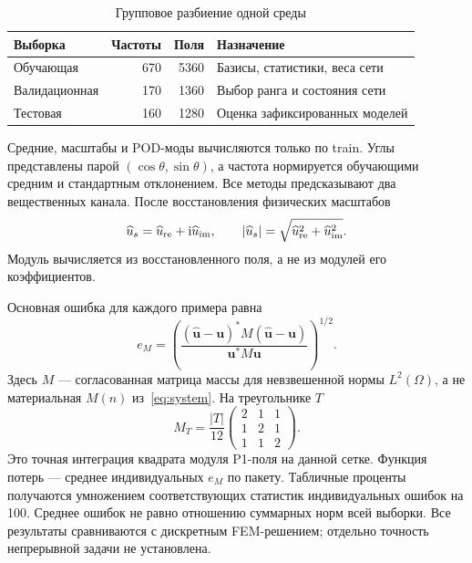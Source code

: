 \documentclass[notitle]{sibjima_preview}
\newcommand{\ii}{\mathrm{i}}
\begin{document}
\begin{table}[htbp]
\centering
\caption{Групповое разбиение одной среды}
\label{tab:split}
\begin{tabular}{@{}lrrl@{}}
\toprule
Выборка & Частоты & Поля & Назначение\\
\midrule
Обучающая & 670 & 5360 & Базисы, статистики, веса сети\\
Валидационная & 170 & 1360 & Выбор ранга и состояния сети\\
Тестовая & 160 & 1280 & Оценка зафиксированных моделей\\
\bottomrule
\end{tabular}
\end{table}

Средние, масштабы и POD-моды вычисляются только по train. Углы представлены парой \((\cos\theta,\sin\theta)\), а частота нормируется обучающими средним и стандартным отклонением. Все методы предсказывают два вещественных канала. После восстановления физических масштабов
\begin{equation}
\widehat u_s=\widehat u_{\rm re}+\ii\widehat u_{\rm im},\qquad
|\widehat u_s|=\sqrt{\widehat u_{\rm re}^2+\widehat u_{\rm im}^2}.
\label{eq:components}
\end{equation}
Модуль вычисляется из восстановленного поля, а не из модулей его коэффициентов.

Основная ошибка для каждого примера равна
\begin{equation}
e_M=\left(\frac{(\widehat{\bm u}-\bm u)^*M(\widehat{\bm u}-\bm u)}{\bm u^*M\bm u}\right)^{1/2}.
\label{eq:metric}
\end{equation}
Здесь \(M\) --- согласованная матрица массы для невзвешенной нормы \(L^2(\Omega)\), а не материальная \(M(n)\) из~\eqref{eq:system}. На треугольнике \(T\)
\begin{equation}
M_T=\frac{|T|}{12}\begin{pmatrix}2&1&1\\1&2&1\\1&1&2\end{pmatrix}.
\label{eq:mass}
\end{equation}
Это точная интеграция квадрата модуля P1-поля на данной сетке. Функция потерь --- среднее индивидуальных \(e_M\) по пакету. Табличные проценты получаются умножением соответствующих статистик индивидуальных ошибок на 100. Среднее ошибок не равно отношению суммарных норм всей выборки. Все результаты сравниваются с дискретным FEM-решением; отдельно точность непрерывной задачи не установлена.
\end{document}
